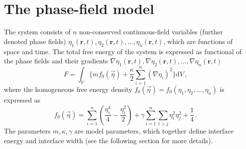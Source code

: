 %
%
%

\section{The phase-field model}
The system consists of $n$ non-conserved continuous-field variables (further denoted phase fields) $\eta_1(\mathbf{r},t), \eta_2(\mathbf{r},t),\dots,\eta_n(\mathbf{r},t)$, which are functions of space and time. The total free energy of the system is expressed as functional of the phase fields and their gradients $\nabla\eta_1(\mathbf{r},t), \nabla\eta_2(\mathbf{r},t),\dots,\nabla\eta_n(\mathbf{r},t)$
\begin{equation} \label{eq_def_totalE_ver1}
	F = \int_V \Bigg\{ m f_0(\vec{\eta}) + \frac{\kappa}{2}\sum_{i=1}^n(\nabla \eta_i)^2 \Bigg\} \mathrm{d}V \,,
\end{equation}
where the homogeneous free energy density $f_0(\vec{\eta}) = f_0(\eta_1, \eta_2,\dots,\eta_n)$ is expressed as 
\begin{equation}
	f_0(\vec{\eta}) = \sum_{i=1}^n\left(\frac{\eta_i^4}{4} - \frac{\eta_i^2}{2} \right) +\gamma\sum_{i=1}^n\sum_{i>j}\eta_i^2\eta_j^2 + \frac{1}{4} \,.
\end{equation}
The parameters $m,\kappa, \gamma$ are model parameters, which together define interface energy and interface width (see the following section for more details).

